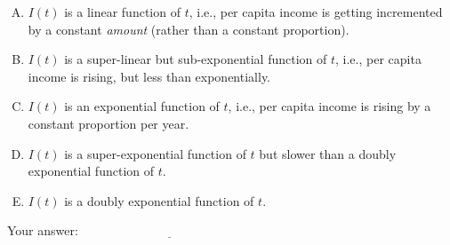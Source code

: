 \documentclass[10pt]{amsart}
\begin{document}
\begin{enumerate}
  \begin{enumerate}[(A)]
  \item $I(t)$ is a linear function of $t$, i.e., per capita income is
    getting incremented by a constant {\em amount} (rather than a
    constant proportion).
  \item $I(t)$ is a super-linear but sub-exponential function of $t$,
    i.e., per capita income is rising, but less than exponentially.
  \item $I(t)$ is an exponential function of $t$, i.e., per capita
    income is rising by a constant proportion per year.
  \item $I(t)$ is a super-exponential function of $t$ but slower than
    a doubly exponential function of $t$.
  \item $I(t)$ is a doubly exponential function of $t$.
  \end{enumerate}

  \vspace{0.1in}
  Your answer: $\underline{\qquad\qquad\qquad\qquad\qquad\qquad\qquad}$
  \vspace{0.15in}

\end{enumerate}
\end{document}

